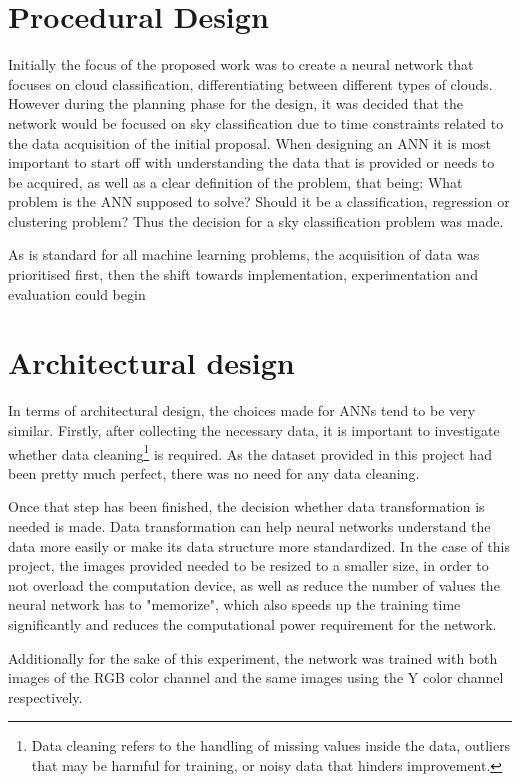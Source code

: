\section{Procedural Design}
Initially the focus of the proposed work was to create a neural network that focuses on cloud classification, differentiating between different types of clouds. However during the planning phase for the design, it was decided that the network would be focused on sky classification due to time constraints related to the data acquisition of the initial proposal. When designing an ANN it is most important to start off with understanding the data that is provided or needs to be acquired, as well as a clear definition of the problem, that being: What problem is the ANN supposed to solve? Should it be a classification, regression or clustering problem? Thus the decision for a sky classification problem was made. 

As is standard for all machine learning problems, the acquisition of data was prioritised first, then the shift towards implementation, experimentation and evaluation could begin

\section{Architectural design}
In terms of architectural design, the choices made for ANNs tend to be very similar. Firstly, after collecting the necessary data, it is important to investigate whether data cleaning\footnote{Data cleaning refers to the handling of missing values inside the data, outliers that may be harmful for training, or noisy data that hinders improvement.} is required. As the dataset provided in this project had been pretty much perfect, there was no need for any data cleaning.

Once that step has been finished, the decision whether data transformation is needed is made. Data transformation can help neural networks understand the data more easily or make its data structure more standardized. In the case of this project, the images provided needed to be resized to a smaller size, in order to not overload the computation device, as well as reduce the number of values the neural network has to "memorize", which also speeds up the training time significantly and reduces the computational power requirement for the network.

Additionally for the sake of this experiment, the network was trained with both images of the RGB color channel and the same images using the Y color channel respectively.

